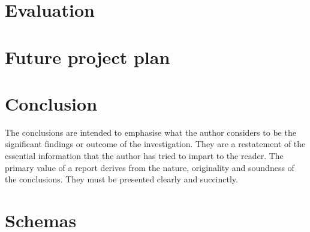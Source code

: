 \documentclass{article}
\begin{document}
\section{Evaluation}

\section{Future project plan}

\section{Conclusion}
The conclusions are intended to emphasise what the author considers to be the significant findings or outcome of the investigation. They are a restatement of the essential information that the author has tried to impart to the reader. The primary value of a report derives from the nature, originality and soundness of the conclusions. They must be presented clearly and succinctly.




\onecolumn
\appendix
\section{Schemas}
% 

\end{document}
